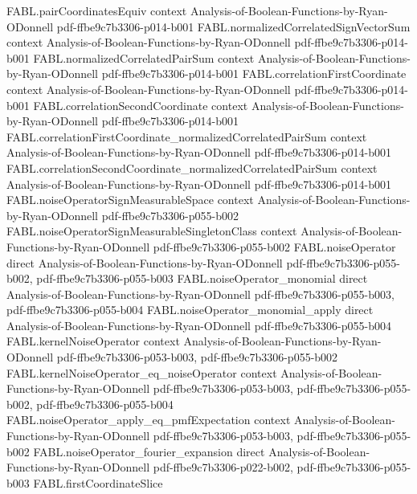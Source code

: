 \begin{theorem}
\proofstep
  {FABL.pairCoordinatesEquiv}
  {context}
  {Analysis-of-Boolean-Functions-by-Ryan-ODonnell}
  {pdf-ffbe9c7b3306-p014-b001}
\proofstep
  {FABL.normalizedCorrelatedSignVectorSum}
  {context}
  {Analysis-of-Boolean-Functions-by-Ryan-ODonnell}
  {pdf-ffbe9c7b3306-p014-b001}
\proofstep
  {FABL.normalizedCorrelatedPairSum}
  {context}
  {Analysis-of-Boolean-Functions-by-Ryan-ODonnell}
  {pdf-ffbe9c7b3306-p014-b001}
\proofstep
  {FABL.correlationFirstCoordinate}
  {context}
  {Analysis-of-Boolean-Functions-by-Ryan-ODonnell}
  {pdf-ffbe9c7b3306-p014-b001}
\proofstep
  {FABL.correlationSecondCoordinate}
  {context}
  {Analysis-of-Boolean-Functions-by-Ryan-ODonnell}
  {pdf-ffbe9c7b3306-p014-b001}
\proofstep
  {FABL.correlationFirstCoordinate_normalizedCorrelatedPairSum}
  {context}
  {Analysis-of-Boolean-Functions-by-Ryan-ODonnell}
  {pdf-ffbe9c7b3306-p014-b001}
\proofstep
  {FABL.correlationSecondCoordinate_normalizedCorrelatedPairSum}
  {context}
  {Analysis-of-Boolean-Functions-by-Ryan-ODonnell}
  {pdf-ffbe9c7b3306-p014-b001}
\proofstep
  {FABL.noiseOperatorSignMeasurableSpace}
  {context}
  {Analysis-of-Boolean-Functions-by-Ryan-ODonnell}
  {pdf-ffbe9c7b3306-p055-b002}
\proofstep
  {FABL.noiseOperatorSignMeasurableSingletonClass}
  {context}
  {Analysis-of-Boolean-Functions-by-Ryan-ODonnell}
  {pdf-ffbe9c7b3306-p055-b002}
\proofstep
  {FABL.noiseOperator}
  {direct}
  {Analysis-of-Boolean-Functions-by-Ryan-ODonnell}
  {pdf-ffbe9c7b3306-p055-b002,
    pdf-ffbe9c7b3306-p055-b003}
\proofstep
  {FABL.noiseOperator_monomial}
  {direct}
  {Analysis-of-Boolean-Functions-by-Ryan-ODonnell}
  {pdf-ffbe9c7b3306-p055-b003,
    pdf-ffbe9c7b3306-p055-b004}
\proofstep
  {FABL.noiseOperator_monomial_apply}
  {direct}
  {Analysis-of-Boolean-Functions-by-Ryan-ODonnell}
  {pdf-ffbe9c7b3306-p055-b004}
\proofstep
  {FABL.kernelNoiseOperator}
  {context}
  {Analysis-of-Boolean-Functions-by-Ryan-ODonnell}
  {pdf-ffbe9c7b3306-p053-b003,
    pdf-ffbe9c7b3306-p055-b002}
\proofstep
  {FABL.kernelNoiseOperator_eq_noiseOperator}
  {context}
  {Analysis-of-Boolean-Functions-by-Ryan-ODonnell}
  {pdf-ffbe9c7b3306-p053-b003,
    pdf-ffbe9c7b3306-p055-b002,
    pdf-ffbe9c7b3306-p055-b004}
\proofstep
  {FABL.noiseOperator_apply_eq_pmfExpectation}
  {context}
  {Analysis-of-Boolean-Functions-by-Ryan-ODonnell}
  {pdf-ffbe9c7b3306-p053-b003,
    pdf-ffbe9c7b3306-p055-b002}
\proofstep
  {FABL.noiseOperator_fourier_expansion}
  {direct}
  {Analysis-of-Boolean-Functions-by-Ryan-ODonnell}
  {pdf-ffbe9c7b3306-p022-b002,
    pdf-ffbe9c7b3306-p055-b003}
\proofstep
  {FABL.firstCoordinateSlice}

\end{theorem}

